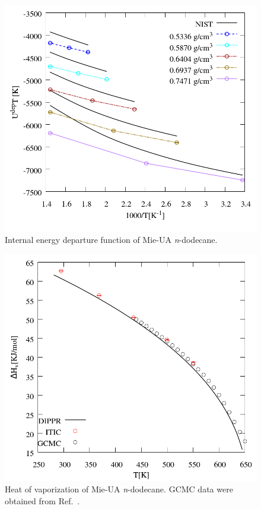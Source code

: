 \documentclass[%
 aip,
 jcp,
 sd,%
 amsmath,amssymb,
]{revtex4-1}
\begin{document}
\begin{figure}[!htbp]
\includegraphics[scale=0.35]{Figures/EXAMPLE-SIM_Mie-C12_udep.png}
\caption{Internal energy departure function of Mie-UA \textit{n}-dodecane.}
\label{fig:EXAMPLE-SIM/Mie-C12/udep}
\end{figure}

\begin{figure}[!htbp]
\includegraphics[scale=0.35]{Figures/EXAMPLE-SIM_Mie-C12_hvap.png}
\caption{Heat of vaporization of Mie-UA \textit{n}-dodecane. GCMC data were obtained from Ref.~.}
\label{fig:EXAMPLE-SIM/Mie-C12/hvap}
\end{figure}
\end{document}
